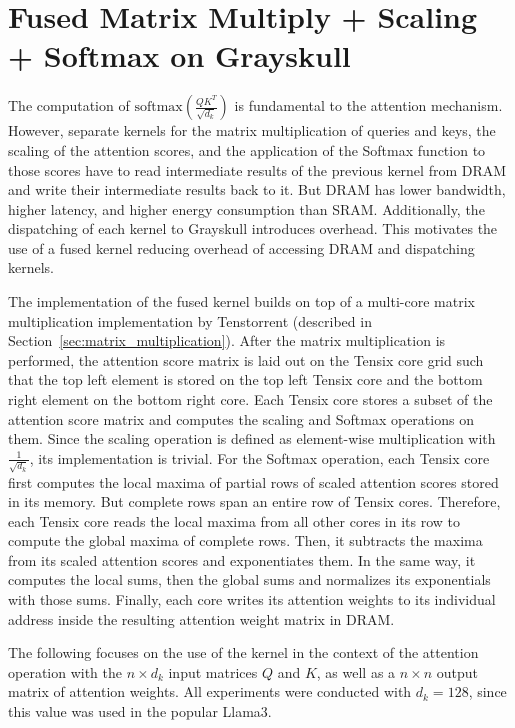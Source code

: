 \documentclass[conference]{IEEEtran}
\begin{document}
\section{Fused Matrix Multiply + Scaling + Softmax on Grayskull}
The computation of \(\text{softmax}\left(\frac{Q K^T}{\sqrt{d_k}}\right)\) is fundamental to the attention mechanism. However, separate kernels for the matrix multiplication of queries and keys, the scaling of the attention scores, and the application of the Softmax function to those scores have to read intermediate results of the previous kernel from DRAM and write their intermediate results back to it. But DRAM has lower bandwidth, higher latency, and higher energy consumption than SRAM. Additionally, the dispatching of each kernel to Grayskull introduces overhead. This motivates the use of a fused kernel reducing overhead of accessing DRAM and dispatching kernels.

The implementation of the fused kernel builds on top of a multi-core matrix multiplication implementation by Tenstorrent \cite{mm-implementation}(described in Section~\ref{sec:matrix_multiplication}). After the matrix multiplication is performed, the attention score matrix is laid out on the Tensix core grid such that the top left element is stored on the top left Tensix core and the bottom right element on the bottom right core. Each Tensix core stores a subset of the attention score matrix and computes the scaling and Softmax operations on them. Since the scaling operation is defined as element-wise multiplication with \(\frac{1}{\sqrt{d_k}}\), its implementation is trivial. For the Softmax operation, each Tensix core first computes the local maxima of partial rows of scaled attention scores stored in its memory. But complete rows span an entire row of Tensix cores. Therefore, each Tensix core reads the local maxima from all other cores in its row to compute the global maxima of complete rows. Then, it subtracts the maxima from its scaled attention scores and exponentiates them. In the same way, it computes the local sums, then the global sums and normalizes its exponentials with those sums. Finally, each core writes its attention weights to its individual address inside the resulting attention weight matrix in DRAM.

The following focuses on the use of the kernel in the context of the attention operation with the \(n \times d_k\) input matrices \(Q\) and \(K\), as well as a \(n \times n\) output matrix of attention weights. All experiments were conducted with \(d_k = 128\), since this value was used in the popular Llama3\cite{meta2024}. 
\end{document}
